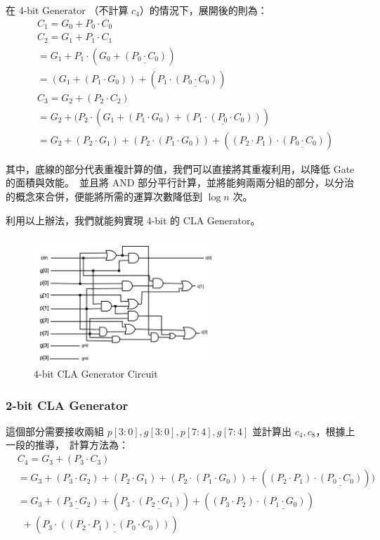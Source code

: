\documentclass[10.5pt,compsoc,UTF8]{CjC}
\theoremstyle{mystyle}
\begin{document}
在 4-bit Generator （不計算 $c_4$）的情況下，展開後的則為：
\begin{align*}
  & C_1 = G_0 + P_0 \cdot C_0 \\
  & C_2 = G_1 + P_1 \cdot C_1 \\
  &= G_1 + P_1 \cdot (G_0 + \underline{(P_0 \cdot C_0)}) \\
  & = (G_1 + (P_1 \cdot G_0)) + (P_1 \cdot \underline{(P_0 \cdot C_0)}) \\
  & C_3 = G_2 + (P_2 \cdot C_2) \\
  & = G_2 + (P_2 \cdot (G_1 + (P_1 \cdot G_0) + \underline{(P_1 \cdot (P_0 \cdot C_0))}) \\
  & = G_2 + (P_2 \cdot G_1) + (P_2 \cdot (P_1 \cdot G_0)) + ((P_2 \cdot P_1) \cdot \underline{(P_0 \cdot C_0)}) \
\end{align*}
\label{math: CLA_Generator}

其中，底線的部分代表重複計算的值，我們可以直接將其重複利用，以降低 Gate 的面積與效能。\ 
並且將 AND 部分平行計算，並將能夠兩兩分組的部分，以分治的概念來合併，便能將所需的運算次數降低到 $\log n$ 次。

利用以上辦法，我們就能夠實現 4-bit 的 CLA Generator。

\begin{figure}[htp]
  \centering
  \includegraphics[width=0.6\textwidth]{4-bit-Gen.png}
  \caption{4-bit CLA Generator Circuit}
  \label{fig:4-bit-Gen}
\end{figure}

\newpage

\subsubsection*{2-bit CLA Generator}
這個部分需要接收兩組 $p[3:0], g[3:0], p[7:4], g[7:4]$ 並計算出 $c_4, c_8$，根據上一段的推導，\
計算方法為：
\begin{align*}
  & C_4 = G_3 + (P_3 \cdot C_3) \\
  & = G_3 + (P_3 \cdot G_2) + (P_2 \cdot G_1) + (P_2 \cdot (P_1 \cdot G_0)) + ((P_2 \cdot P_1) \cdot \underline{(P_0 \cdot C_0)})) \\
  & = G_3 + \underline{(P_3 \cdot G_2)} + (P_3 \cdot \underline{(P_2 \cdot G_1)}) + ((P_3 \cdot P_2) \cdot \underline{(P_1 \cdot G_0)}) \\
  & \ \ + (P_3 \cdot \underline{((P_2 \cdot P_1) \cdot (P_0 \cdot C_0))})
\end{align*}
\end{document}
